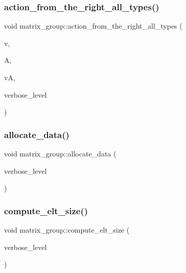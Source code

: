 \subsubsection{\texorpdfstring{action\+\_\+from\+\_\+the\+\_\+right\+\_\+all\+\_\+types()}{action\_from\_the\_right\_all\_types()}}
{\footnotesize\ttfamily void matrix\+\_\+group\+::action\+\_\+from\+\_\+the\+\_\+right\+\_\+all\+\_\+types (\begin{DoxyParamCaption}\item[{\mbox{\hyperlink{galois_8h_a09fddde158a3a20bd2dcadb609de11dc}{I\+NT}} $\ast$}]{v,  }\item[{\mbox{\hyperlink{galois_8h_a09fddde158a3a20bd2dcadb609de11dc}{I\+NT}} $\ast$}]{A,  }\item[{\mbox{\hyperlink{galois_8h_a09fddde158a3a20bd2dcadb609de11dc}{I\+NT}} $\ast$}]{vA,  }\item[{\mbox{\hyperlink{galois_8h_a09fddde158a3a20bd2dcadb609de11dc}{I\+NT}}}]{verbose\+\_\+level }\end{DoxyParamCaption})}

\mbox{\label{classmatrix__group_ae6838e1e90d2c24ea1b15246a452c2e6}} 
\subsubsection{\texorpdfstring{allocate\+\_\+data()}{allocate\_data()}}
{\footnotesize\ttfamily void matrix\+\_\+group\+::allocate\+\_\+data (\begin{DoxyParamCaption}\item[{\mbox{\hyperlink{galois_8h_a09fddde158a3a20bd2dcadb609de11dc}{I\+NT}}}]{verbose\+\_\+level }\end{DoxyParamCaption})}

\mbox{\label{classmatrix__group_afb94f8d9997e7b6c93f595e576a9c6d6}} 
\subsubsection{\texorpdfstring{compute\+\_\+elt\+\_\+size()}{compute\_elt\_size()}}
{\footnotesize\ttfamily void matrix\+\_\+group\+::compute\+\_\+elt\+\_\+size (\begin{DoxyParamCaption}\item[{\mbox{\hyperlink{galois_8h_a09fddde158a3a20bd2dcadb609de11dc}{I\+NT}}}]{verbose\+\_\+level }\end{DoxyParamCaption})}


